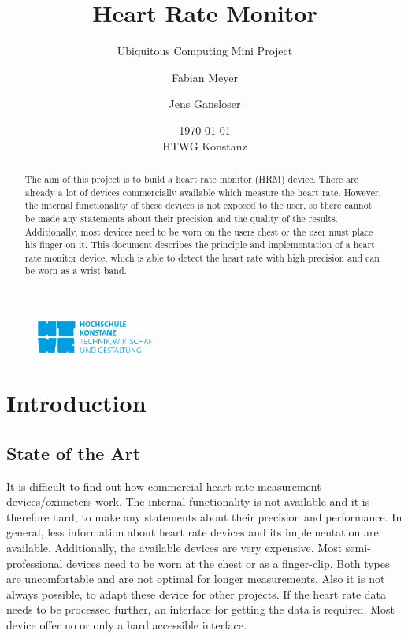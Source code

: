 \documentclass[notitlepage]{scrreprt}
\begin{document}
\title{Heart Rate Monitor}
\subtitle{Ubiquitous Computing Mini Project}
\author{Fabian Meyer \and Jens Gansloser}
\date{\today \\ HTWG Konstanz}
\maketitle
\thispagestyle{empty}

\begin{figure}[H]
	\centering
	\includegraphics[width=150px]{images/htwgLogo.jpg}
\end{figure}

\begin{abstract}
The aim of this project is to build a heart rate monitor (HRM) device. There are already a lot of devices commercially available which measure the heart rate. However, the internal functionality of these devices is not exposed to the user, so there cannot be made any statements about their precision and the quality of the results. Additionally, most devices need to be worn on the users chest or the user must place his finger on it. This document describes the principle and implementation of a heart rate monitor device, which is able to detect the heart rate with high precision and can be worn as a wrist band.
\end{abstract}
\clearpage

\tableofcontents

\chapter{Introduction}
\section{State of the Art}
It is difficult to find out how commercial heart rate measurement devices/oximeters work. The internal functionality is not available and it is therefore hard, to make any statements about their precision and performance. In general, less information about heart rate devices and its implementation are available. Additionally, the available devices are very expensive. Most semi-professional devices need to be worn at the chest or as a finger-clip. Both types are uncomfortable and are not optimal for longer measurements. Also it is not always possible, to adapt these device for other projects. If the heart rate data needs to be processed further, an interface for getting the data is required. Most device offer no or only a hard accessible interface.
\end{document}
